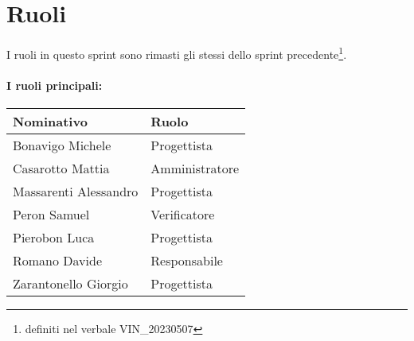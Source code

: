 \section{Ruoli}

I ruoli in questo sprint sono rimasti gli stessi dello sprint precedente\footnote{definiti nel verbale VIN\_20230507}.

\paragraph{I ruoli principali:}

\begin{center}
    \begin{tabularx}{\textwidth}{X l}

        \rowcolor{gray!30} \textbf{Nominativo} & \textbf{Ruolo}\\

        \hline

        Bonavigo Michele & Progettista \\
        \rowcolor{gray!10}Casarotto Mattia & Amministratore \\
        Massarenti Alessandro & Progettista \\
        \rowcolor{gray!10}Peron Samuel & Verificatore \\
        Pierobon Luca & Progettista \\
        \rowcolor{gray!10}Romano Davide & Responsabile \\
        Zarantonello Giorgio & Progettista \\

    \end{tabularx}
\end{center}